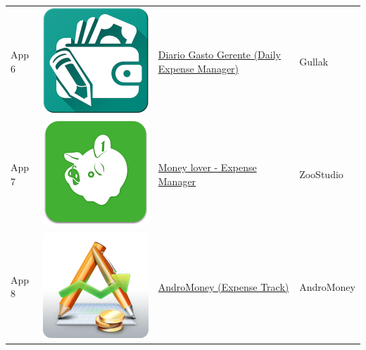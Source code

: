 \begin{table}
\begin{tabular}{ | l | c | l | l | }
App 6 & \includegraphics[scale=0.05]{A06_icon.png} & \href{https://play.google.com/store/apps/details?id=com.techahead.ExpenseManager}{Diario Gasto Gerente (Daily Expense Manager)} & Gullak \\

App 7 & \includegraphics[scale=0.05]{A07_icon.png} & \href{https://play.google.com/store/apps/details?id=com.bookmark.money}{Money lover - Expense Manager} & ZooStudio   \\

App 8 & \includegraphics[scale=0.05]{A08_icon.png} & \href{https://play.google.com/store/apps/details?id=com.kpmoney.android}{AndroMoney (Expense Track)} & AndroMoney \\


\end{tabular}
\end{table}
